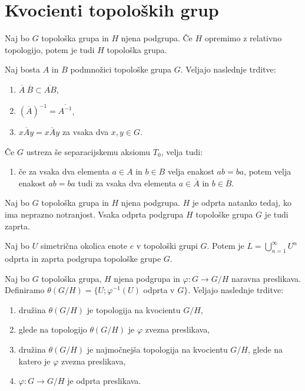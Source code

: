 \documentclass[mat1]{fmfdelo}
\newcommand{\closure}[1]{\overline{#1}}
\begin{document}
\section{Kvocienti topoloških grup}

\begin{trditev}\label{trd:toppodgrupa}
Naj bo $G$ topološka grupa in $H$ njena podgrupa. Če $H$ opremimo z relativno topologijo, potem je tudi $H$ topološka grupa.
\end{trditev}

\begin{trditev}\label{trd:zaprtost}
Naj bosta $A$ in $B$ podmnožici topološke grupa $G$. Veljajo naslednje trditve:
\begin{enumerate}
\item $\closure{A}\ \closure{B} \subset \closure{A B}$,
\item $(\closure{A})^{-1} = \closure{A^{-1}}$,
\item $x \closure{A} y = \closure{x A y}$ za vsaka dva $x, y \in G$.
\end{enumerate}

Če $G$ ustreza še separacijskemu aksiomu $T_0$, velja tudi:
\begin{enumerate}[resume]
\item če za vsaka dva elementa $a \in A$ in $b \in B$ velja enakost $ab = ba$, potem velja enakost $ab = ba$ tudi za vsaka dva elementa $a \in \closure{A}$ in $b \in \closure{B}$.
\end{enumerate}
\end{trditev}

\begin{trditev}\label{trd:odpzap}
Naj bo $G$ topološka grupa in $H$ njena podgrupa. $H$ je odprta natanko tedaj, ko ima neprazno notranjost. Vsaka odprta podgrupa $H$ topološke grupa $G$ je tudi zaprta.
\end{trditev}

\begin{trditev}\label{trd:podgrupaunija}
Naj bo $U$ simetrična okolica enote $e$ v topološki grupi $G$. Potem je $L = \bigcup_{n=1}^{\infty} U^n$ odprta in zaprta podgrupa topološke grupe $G$.
\end{trditev}


\begin{izrek}\label{izr:topkvocienta}
Naj bo $G$ topološka grupa, $H$ njena podgrupa in $\varphi: G \to G/H$ naravna preslikava. Definiramo $\theta(G/H) = \lbrace U ; \varphi^{-1}(U)$ odprta v $G \rbrace$.
Veljajo naslednje trditve:
\begin{enumerate}
\item družina $\theta(G/H)$ je topologija na kvocientu $G/H$,
\item glede na topologijo $\theta(G/H)$ je $\varphi$ zvezna preslikava,
\item družina $\theta(G/H)$ je najmočnejša topologija na kvocientu $G/H$, glede na katero je $\varphi$ zvezna preslikava,
\item $\varphi: G \to G/H$ je odprta preslikava.
\end{enumerate}
\end{izrek}
\end{document}
